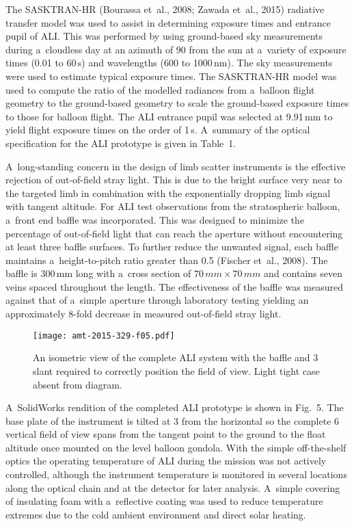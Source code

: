 \documentclass[amt]{copernicus}
\begin{document}
The SASKTRAN-HR (Bourassa et~al., 2008; Zawada et~al., 2015) radiative
transfer model was used to assist in determining exposure times and
entrance pupil of ALI. This was performed by using ground-based sky
measurements during a~cloudless day at an azimuth of 90{\degree} from
the sun at a~variety of exposure times (0.01 to 60\,s) and wavelengths
(600 to 1000\,\unit{nm}). The sky measurements were used to estimate
typical exposure times. The SASKTRAN-HR model was used to compute the
ratio of the modelled radiances from a~balloon flight geometry to the
ground-based geometry to scale the ground-based exposure times to
those for balloon flight. The ALI entrance pupil was selected at
9.91\,\unit{mm} to yield flight exposure times on the order of
1\,s. A~summary of the optical specification for the ALI prototype is
given in Table~1.

A~long-standing concern in the design of limb scatter instruments is
the effective rejection of out-of-field stray light. This is due to
the bright surface very near to the targeted limb in combination with
the exponentially dropping limb signal with tangent altitude. For ALI
test observations from the stratospheric balloon, a~front end baffle
was incorporated. This was designed to minimize the percentage of
out-of-field light that can reach the aperture without encountering at
least three baffle surfaces. To further reduce the unwanted signal,
each baffle maintains a~height-to-pitch ratio greater than 0.5
(Fischer et~al., 2008). The baffle is 300\,\unit{mm} long with a~cross
section of $70\,\unit{mm} \times 70\,\unit{mm}$ and contains seven
veins spaced throughout the length. The effectiveness of the baffle
was measured against that of a~simple aperture through laboratory
testing yielding an approximately 8-fold decrease in measured
out-of-field stray light.

\begin{figure*}[t]
\texttt{[image: amt-2015-329-f05.pdf]}
\caption{An isometric view of the complete ALI system with the baffle
  and 3{\degree} slant required to correctly position the field of
  view. Light tight case absent from diagram.}
\end{figure*}



A~SolidWorks rendition of the completed ALI prototype is shown in
Fig.~5. The base plate of the instrument is tilted at 3{\degree} from
the horizontal so the complete 6{\degree} vertical field of view spans
from the tangent point to the ground to the float altitude once
mounted on the level balloon gondola.  With the simple off-the-shelf
optics the operating temperature of ALI during the mission was not
actively controlled, although the instrument temperature is monitored
in several locations along the optical chain and at the detector for
later analysis. A~simple covering of insulating foam with a~reflective
coating was used to reduce temperature extremes due to the cold
ambient environment and direct solar heating.
\end{document}
